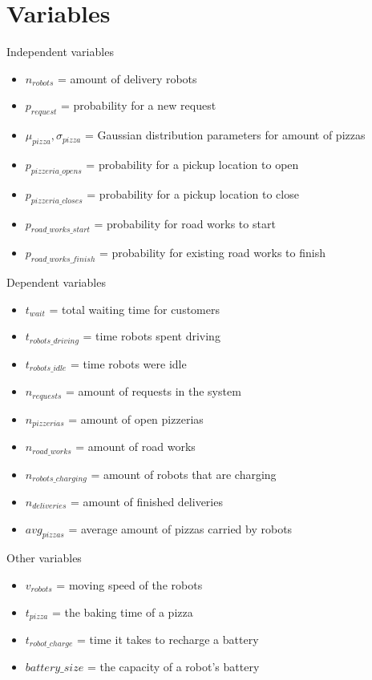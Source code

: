 \section{Variables}
\begin{frame}{Independent variables}
    \begin{itemize}
        \item $n_{robots}$ = amount of delivery robots
        \item $p_{request}$ = probability for a new request
        \item $\mu_{pizza}, \sigma_{pizza}$ = Gaussian distribution parameters for amount of pizzas
        \item $p_{pizzeria\_opens}$  = probability for a pickup location to open
        \item $p_{pizzeria\_closes}$ = probability for a pickup location to close
        \item $p_{road\_works\_start}$ = probability for road works to start
        \item $p_{road\_works\_finish}$ = probability for existing road works to finish
    \end{itemize}
\end{frame}

\begin{frame}{Dependent variables}
    \begin{itemize}
        \item $t_{wait}$ = total waiting time for customers
        \item $t_{robots\_driving}$ = time robots spent driving
        \item $t_{robots\_idle}$ = time robots were idle
        \item $n_{requests}$ = amount of requests in the system
        \item $n_{pizzerias}$ = amount of open pizzerias
        \item $n_{road\_works}$ = amount of road works
        \item $n_{robots\_charging}$ = amount of robots that are charging
        \item $n_{deliveries}$ = amount of finished deliveries
        \item $avg_{pizzas}$ = average amount of pizzas carried by robots
    \end{itemize}
\end{frame}

\begin{frame}{Other variables}
    \begin{itemize}
        \item $v_{robots}$ = moving speed of the robots
        \item $t_{pizza}$ = the baking time of a pizza
        \item $t_{robot\_charge}$ = time it takes to recharge a battery
        \item $battery\_size$ = the capacity of a robot's battery
    \end{itemize}
\end{frame}
